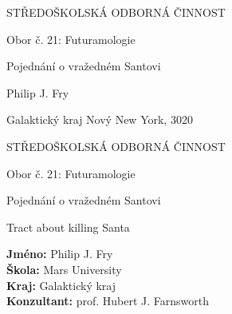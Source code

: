 \documentclass[12pt, a4paper,
 twoside,        %
 openright
]{report}
\title{\mainTitle} %
\author{\authorName} %
\date{\publicationYear} %
\newcommand\city{Nový New York} %
\newcommand\district{Galaktický kraj} %
\newcommand\specialization{Obor č. 21: Futuramologie} %
\newcommand\school{Mars University} %
\newcommand\consultant{prof. Hubert J. Farnsworth} %
\newcommand\authorName{Philip J. Fry}  %
\newcommand\publicationYear{3020} %
\newcommand\mainTitle{Pojednání o vražedném Santovi} %
\begin{document}
\pagestyle{empty}

\begin{titlepage}
    \bfseries{ %
        \begin{center}
            \LARGE{STŘEDOŠKOLSKÁ ODBORNÁ ČINNOST}

            \vspace{14pt}
            \large{ %
                \specialization
            } %

            \vspace{0.4 \textheight}

            \LARGE{ %
                \mainTitle
            }%

            \vspace{0.4\textheight}
        \end{center}
        
        \noindent\Large{\authorName} 

        \noindent\Large{\district {}  \city, \publicationYear} 
        
            
    } %
\end{titlepage}

\cleardoublepage

{\bfseries %
    \begin{center}
        \LARGE{STŘEDOŠKOLSKÁ ODBORNÁ ČINNOST}

        \vspace{14pt}
        {\large %
            \specialization %
        } %

        \vspace{0.3 \textheight}

        \LARGE{ %
        \mainTitle
        }

        \LARGE{ %
        Tract about killing Santa
        }%

        \vspace{0.24\textheight}
    \end{center}  
}%
{\Large %
    \noindent\textbf{Jméno:} \authorName\\
    \textbf{Škola:} \school\\
    \textbf{Kraj:} \district\\
    \textbf{Konzultant:} \consultant\\
} %
\end{document}
